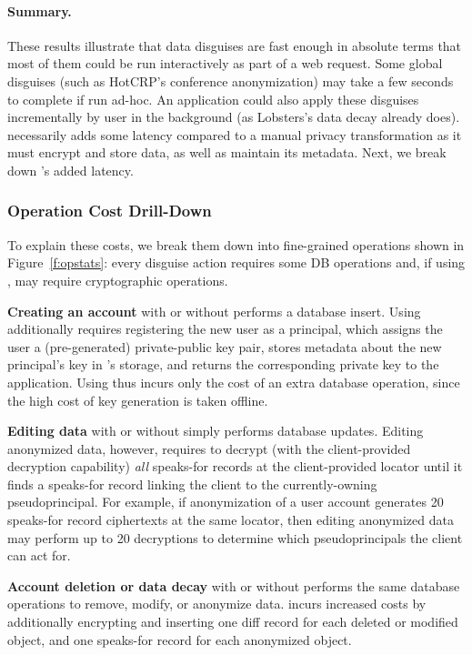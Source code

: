 \paragraph{Summary.}
%
These results illustrate that data disguises are fast enough in absolute terms
that most of them could be run interactively as part of a web request.
%
Some global disguises (such as HotCRP's conference anonymization) may take a
few seconds to complete if run ad-hoc.
%
An application could also apply these disguises incrementally by user in the
background (as Lobsters's data decay already does).
%
\sys necessarily adds some latency compared to a manual privacy transformation
as it must encrypt and store data, as well as maintain its metadata.
%
Next, we break down \sys's added latency.
%

\subsubsection{\sys Operation Cost Drill-Down}
%
To explain these costs, we break them down into fine-grained operations shown in
Figure~\ref{f:opstats}: every disguise action requires some DB operations and,
if using \sys, may require cryptographic operations.

\textbf{Creating an account} with or without \sys performs a database insert. Using \sys additionally
requires registering the new user as a principal, which assigns the user a (pre-generated)
private-public key pair, stores metadata about the new principal's key in \sys's storage, and
returns the corresponding private key to the application.
Using \sys thus incurs only the cost of an extra database operation, since the high cost of key
generation is taken offline.

\textbf{Editing data} with or without \sys simply performs database updates. Editing anonymized
data, however, requires \sys to decrypt (with the client-provided decryption capability) \emph{all}
speaks-for records at the client-provided locator until it finds a speaks-for record linking the
client to the currently-owning pseudoprincipal.  For example, if anonymization of a user account
generates 20 speaks-for record ciphertexts at the same locator, then editing anonymized data may
perform up to 20 decryptions to determine which pseudoprincipals the client can act for.

\textbf{Account deletion or data decay} with or without \sys performs the same database operations
to remove, modify, or anonymize data. \sys incurs increased costs by additionally encrypting and
inserting one diff record for each deleted or modified object, and one speaks-for record for each
anonymized object.

